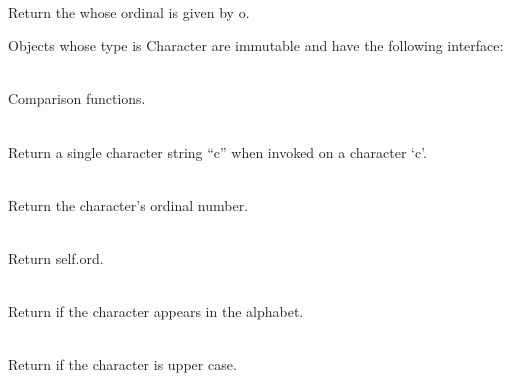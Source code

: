 \begin{desc}
  \item[\kw{function} Literal\/\LB{}o \CO{} \tn{Integer}\/\RB{} \returns{} \/\LB{}\tn{Character}\/\RB{}]~\\
    Return the  whose ordinal is given by o.
\end{desc}

\noindent Objects whose type is Character are immutable and have the
following interface:

\begin{desc}
  \item[\kw{function} \opd{$>$} \/\LB{}\tn{Character}\/\RB{} \returns{} \/\LB{}\tn{Boolean}\/\RB{}]
  \item[\kw{function} \opd{$>=$} \/\LB{}\tn{Character}\/\RB{} \returns{} \/\LB{}\tn{Boolean}\/\RB{}]
  \item[\kw{function} \opd{$<$} \/\LB{}\tn{Character}\/\RB{} \returns{} \/\LB{}\tn{Boolean}\/\RB{}]
  \item[\kw{function} \opd{$<=$} \/\LB{}\tn{Character}\/\RB{} \returns{} \/\LB{}\tn{Boolean}\/\RB{}]
  \item[\kw{function} \opd{$=$} \/\LB{}\tn{Character}\/\RB{} \returns{} \/\LB{}\tn{Boolean}\/\RB{}]
  \item[\kw{function} \opd{$!=$} \/\LB{}\tn{Character}\/\RB{} \returns{} \/\LB{}\tn{Boolean}\/\RB{}]~\\
  Comparison functions.
  \item[\kw{function} asString \returns{} \/\LB{}\tn{String}\/\RB{}]~\\
    Return a single character string ``c'' when invoked on a character `c'.
  \item[\kw{function} ord \returns{} \/\LB{}\tn{Integer}\/\RB{}]~\\
    Return the character's ordinal number.
  \item[\kw{function} hash \returns{} \/\LB{}\tn{Integer}\/\RB{}]~\\
    Return self.ord.
  \item[\kw{function} isalpha \returns{} \/\LB{}r \CO{} \tn{Boolean}\/\RB{}]~\\
    Return  if the character appears in the alphabet.
  \item[\kw{function} isupper \returns{} \/\LB{}r \CO{} \tn{Boolean}\/\RB{}]~\\
    Return  if the character is upper case.
  \item[\kw{function} islower \returns{} \/\LB{}r \CO{} \tn{Boolean}\/\RB{}]~\\

\end{desc}
